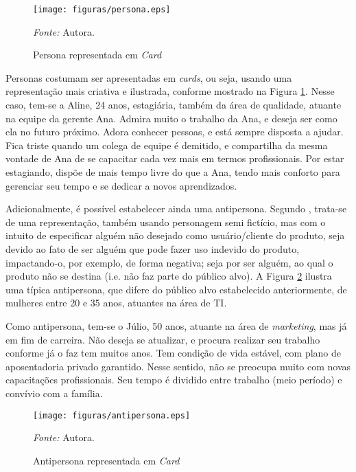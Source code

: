 \begin{figure}[h!]
	\centering
	\caption{Persona representada em \textit{Card}}
  \begin{adjustbox}{center}
	  \texttt{[image: figuras/persona.eps]}
  \end{adjustbox}
  \begin{tablenotes}[flushleft]
    \centering
    \item \textit{Fonte:} Autora.
  \end{tablenotes}
	\label{fig01}
\end{figure}

Personas costumam ser apresentadas em \textit{cards}, ou seja, usando uma representação mais criativa e ilustrada, conforme mostrado na 
Figura \ref{fig01}. Nesse caso, tem-se a Aline, 24 anos, estagiária, também da área de qualidade, atuante na equipe da gerente Ana. Admira 
muito o trabalho da Ana, e deseja ser como ela no futuro próximo. Adora conhecer pessoas, e está sempre disposta a ajudar. Fica 
triste quando um colega de equipe é demitido, e compartilha da mesma vontade de Ana de se capacitar cada vez mais em termos profissionais. 
Por estar estagiando, dispõe de mais tempo livre do que a Ana, tendo mais conforto para gerenciar seu tempo e se dedicar a novos aprendizados.

Adicionalmente, é possível estabelecer ainda uma antipersona. Segundo , trata-se de uma representação, também usando 
personagem semi fictício, mas com o intuito de especificar alguém não desejado como usuário/cliente do produto, seja devido ao fato de ser 
alguém que pode fazer uso indevido do produto, impactando-o, por exemplo, de forma negativa; seja por ser alguém, ao qual o produto não se 
destina (i.e. não faz parte do público alvo). A Figura \ref{fig02} ilustra uma típica antipersona, que difere do público alvo estabelecido anteriormente, 
de mulheres entre 20 e 35 anos, atuantes na área de TI.

Como antipersona, tem-se o Júlio, 50 anos, atuante na área de \textit{marketing}, mas já em fim de carreira. Não deseja se atualizar, e procura realizar 
seu trabalho conforme já o faz tem muitos anos. Tem condição de vida estável, com plano de aposentadoria privado garantido. Nesse sentido, não se 
preocupa muito com novas capacitações profissionais. Seu tempo é dividido entre trabalho (meio período) e convívio com a família.

\begin{figure}[h!]
	\centering
	\caption{Antipersona representada em \textit{Card}}
  \begin{adjustbox}{center}
	  \texttt{[image: figuras/antipersona.eps]}
  \end{adjustbox}
  \begin{tablenotes}[flushleft]
    \centering
    \item \textit{Fonte:} Autora.
  \end{tablenotes}
	\label{fig02}
\end{figure}

